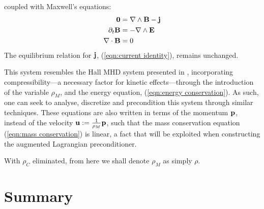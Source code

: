     coupled with Maxwell's equations:
    \begin{align}
        \mathbf{0}  &=  \nabla\wedge\mathbf{B} - \mathbf{j}  \label{eqn:Ampère's law}  \\
        \partial_{t}\mathbf{B}  &=  - \nabla\wedge\mathbf{E}  \label{eqn:Faraday's law}  \\
        \nabla\cdot\mathbf{B}  &=  0  \label{eqn:Gauss's law}
    \end{align}
    The equilibrium relation for $\mathbf{j}$, (\ref{eqn:current identity}), remains unchanged.

    This system resembles the Hall MHD system presented in \cite{LHF22}, incorporating compressibility—a necessary factor for kinetic effects—through the introduction of the variable $\rho_{M}$, and the energy equation, (\ref{eqn:energy conservation}). As such, one can seek to analyse, discretize and precondition this system through similar techniques. These equations are also written in terms of the momentum $\mathbf{p}$, instead of the velocity $\mathbf{u}  :=  \frac{1}{\rho_{M}}\mathbf{p}$, such that the mass conservation equation (\ref{eqn:mass conservation}) is linear, a fact that will be exploited when constructing the augmented Lagrangian preconditioner.

    With $\rho_{C}$ eliminated, from here we shall denote $\rho_{M}$ as simply $\rho$.
    

    
    
    

    
    \section*{Summary}
    